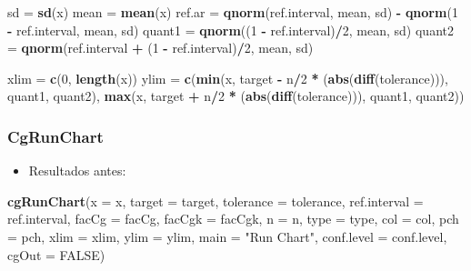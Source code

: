 \documentclass[
]{book}
\newenvironment{Shaded}{\begin{snugshade}}{\end{snugshade}}
\newcommand{\AttributeTok}[1]{\textcolor[rgb]{0.13,0.29,0.53}{#1}}
\newcommand{\ConstantTok}[1]{\textcolor[rgb]{0.56,0.35,0.01}{#1}}
\newcommand{\DecValTok}[1]{\textcolor[rgb]{0.00,0.00,0.81}{#1}}
\newcommand{\FunctionTok}[1]{\textcolor[rgb]{0.13,0.29,0.53}{\textbf{#1}}}
\newcommand{\NormalTok}[1]{#1}
\newcommand{\OtherTok}[1]{\textcolor[rgb]{0.56,0.35,0.01}{#1}}
\newcommand{\SpecialCharTok}[1]{\textcolor[rgb]{0.81,0.36,0.00}{\textbf{#1}}}
\newcommand{\StringTok}[1]{\textcolor[rgb]{0.31,0.60,0.02}{#1}}
\providecommand{\tightlist}{%
  \setlength{\itemsep}{0pt}\setlength{\parskip}{0pt}}
\begin{document}
\begin{Shaded}
\begin{Highlighting}[]
\NormalTok{sd }\OtherTok{=} \FunctionTok{sd}\NormalTok{(x)}
\NormalTok{  mean }\OtherTok{=} \FunctionTok{mean}\NormalTok{(x)}
\NormalTok{  ref.ar }\OtherTok{=} \FunctionTok{qnorm}\NormalTok{(ref.interval, mean, sd) }\SpecialCharTok{{-}} \FunctionTok{qnorm}\NormalTok{(}\DecValTok{1} \SpecialCharTok{{-}}\NormalTok{ ref.interval, }
\NormalTok{                                                 mean, sd)}
\NormalTok{quant1 }\OtherTok{=} \FunctionTok{qnorm}\NormalTok{((}\DecValTok{1} \SpecialCharTok{{-}}\NormalTok{ ref.interval)}\SpecialCharTok{/}\DecValTok{2}\NormalTok{, mean, sd)}
\NormalTok{  quant2 }\OtherTok{=} \FunctionTok{qnorm}\NormalTok{(ref.interval }\SpecialCharTok{+}\NormalTok{ (}\DecValTok{1} \SpecialCharTok{{-}}\NormalTok{ ref.interval)}\SpecialCharTok{/}\DecValTok{2}\NormalTok{, mean, }
\NormalTok{                 sd)}


\NormalTok{xlim }\OtherTok{=} \FunctionTok{c}\NormalTok{(}\DecValTok{0}\NormalTok{, }\FunctionTok{length}\NormalTok{(x))}
\NormalTok{ylim }\OtherTok{=} \FunctionTok{c}\NormalTok{(}\FunctionTok{min}\NormalTok{(x, target }\SpecialCharTok{{-}}\NormalTok{ n}\SpecialCharTok{/}\DecValTok{2} \SpecialCharTok{*}\NormalTok{ (}\FunctionTok{abs}\NormalTok{(}\FunctionTok{diff}\NormalTok{(tolerance))), }
\NormalTok{             quant1, quant2), }\FunctionTok{max}\NormalTok{(x, target }\SpecialCharTok{+}\NormalTok{ n}\SpecialCharTok{/}\DecValTok{2} \SpecialCharTok{*}\NormalTok{ (}\FunctionTok{abs}\NormalTok{(}\FunctionTok{diff}\NormalTok{(tolerance))), }
\NormalTok{                                  quant1, quant2))}
\end{Highlighting}
\end{Shaded}

\hypertarget{cgrunchart}{%
\subsubsection{CgRunChart}\label{cgrunchart}}

\begin{itemize}
\tightlist
\item
  Resultados antes:
\end{itemize}

\begin{Shaded}
\begin{Highlighting}[]
\FunctionTok{cgRunChart}\NormalTok{(}\AttributeTok{x =}\NormalTok{ x, }\AttributeTok{target =}\NormalTok{ target, }\AttributeTok{tolerance =}\NormalTok{ tolerance, }
           \AttributeTok{ref.interval =}\NormalTok{ ref.interval, }\AttributeTok{facCg =}\NormalTok{ facCg, }\AttributeTok{facCgk =}\NormalTok{ facCgk, }
           \AttributeTok{n =}\NormalTok{ n, }\AttributeTok{type =}\NormalTok{ type, }\AttributeTok{col =}\NormalTok{ col, }\AttributeTok{pch =}\NormalTok{ pch, }\AttributeTok{xlim =}\NormalTok{ xlim, }
           \AttributeTok{ylim =}\NormalTok{ ylim, }\AttributeTok{main =} \StringTok{"Run Chart"}\NormalTok{, }\AttributeTok{conf.level =}\NormalTok{ conf.level, }\AttributeTok{cgOut =} \ConstantTok{FALSE}\NormalTok{)}
\end{Highlighting}
\end{Shaded}
\end{document}
